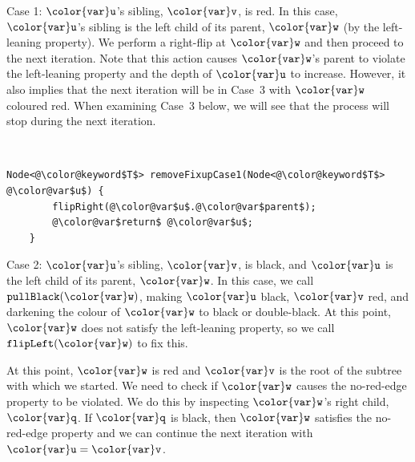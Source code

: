 \documentclass[10pt]{book}
\theoremstyle{plain}
\theoremstyle{definition}
\begin{document}
\noindent 
Case 1: \ensuremath{\mathtt{{\color{var}u}}}'s sibling, \ensuremath{\mathtt{{\color{var}v}}}, is red.  In this case, \ensuremath{\mathtt{{\color{var}u}}}'s sibling is the
left child of its parent, \ensuremath{\mathtt{{\color{var}w}}} (by the left-leaning property).  We perform
a right-flip at \ensuremath{\mathtt{{\color{var}w}}} and then proceed to the next iteration.  Note that
this action causes \ensuremath{\mathtt{{\color{var}w}}}'s parent to violate the left-leaning property and
the depth of \ensuremath{\mathtt{{\color{var}u}}} to increase.  However, it also implies that the next
iteration will be in Case~3 with \ensuremath{\mathtt{{\color{var}w}}} coloured red.  When examining Case~3
below, we will see that the process will stop during the next iteration.


 \ \vspace{.5ex}\begin{Verbatim}[gobble=1,tabsize=2,frame=single,framerule=1.2pt,commandchars=\\@\$,label=\texttt{RedBlackTree},labelposition=topline]
	Node<@\color@keyword$T$> removeFixupCase1(Node<@\color@keyword$T$> @\color@var$u$) {
		flipRight(@\color@var$u$.@\color@var$parent$);
		@\color@var$return$ @\color@var$u$;
	}
\end{Verbatim}


\noindent
Case 2: \ensuremath{\mathtt{{\color{var}u}}}'s sibling, \ensuremath{\mathtt{{\color{var}v}}}, is black, and \ensuremath{\mathtt{{\color{var}u}}} is the left child of its
parent, \ensuremath{\mathtt{{\color{var}w}}}.  In this case, we call \ensuremath{\mathtt{pullBlack({\color{var}w})}}, making \ensuremath{\mathtt{{\color{var}u}}} black,
\ensuremath{\mathtt{{\color{var}v}}} red, and darkening the colour of \ensuremath{\mathtt{{\color{var}w}}} to black or double-black.
At this point, \ensuremath{\mathtt{{\color{var}w}}} does not satisfy the left-leaning property, so we
call \ensuremath{\mathtt{flipLeft({\color{var}w})}} to fix this.

At this point, \ensuremath{\mathtt{{\color{var}w}}} is red and \ensuremath{\mathtt{{\color{var}v}}} is the root of the subtree with which
we started.  We need to check if \ensuremath{\mathtt{{\color{var}w}}} causes the no-red-edge property to
be violated.  We do this by inspecting \ensuremath{\mathtt{{\color{var}w}}}'s right child, \ensuremath{\mathtt{{\color{var}q}}}.  If \ensuremath{\mathtt{{\color{var}q}}}
is black, then \ensuremath{\mathtt{{\color{var}w}}} satisfies the no-red-edge property and we can continue
the next iteration with $\ensuremath{\mathtt{{\color{var}u}}}=\ensuremath{\mathtt{{\color{var}v}}}$.
\end{document}
